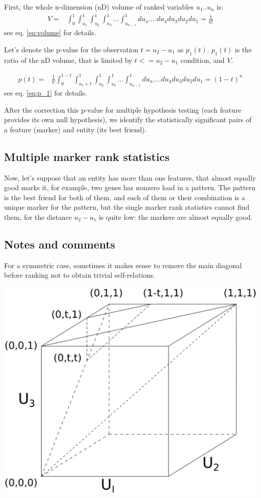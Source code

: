 \documentclass{llncs}
\begin{document}
First, the whole n-dimension (nD) volume of ranked variables $u_1 .. u_n$ is:
\begin{eqnarray*}
V = &\displaystyle \int_0^1\int_{u_1}^1\int_{u_2}^1\int_{u_3}^1...\int_{u_{n-1}}^1 du_n....du_4 du_3 du_2 du_1 =  \frac{1}{n!}
\end{eqnarray*}
see eq. \ref{eq:volume} for details.

Let's denote the p-value for the observation $t=u_2-u_1$ as $p_1(t)$. $p_1(t)$ is the ratio of the nD volume, that is limited by $t<=u_2-u_1$ condition, and $V$.

\begin{eqnarray*}
p(t) = & \displaystyle\frac{1}{V} \displaystyle \int_0^{1-t}\int_{{u_1}+t}^1\int_{u_2}^1\int_{u_3}^1...\int_{u_{n-1}}^1 du_n....du_4 du_3 du_2 du_1 = (1-t)^n
\end{eqnarray*}
see eq. \ref{eq:p_1} for details.

After the correction this p-value for multiple hypothesis testing (each feature provides its own null hypothesis), we identify the statistically significant pairs of a feature (marker) and entity (its best friend).

\subsection{Multiple marker rank statistics}
Now, let's suppose that an entity has more than one features, that almost equally good marks it, for example, two genes has nonzero load in a pattern. The pattern is the best friend for both of them, and each of them or their combination is a unique marker for the pattern, but the single marker rank statistics cannot find them, for the distance $u_2-u_1$ is quite low: the markers are almost equally good.

\subsection*{Notes and comments}

For a symmetric case, sometimes it makes sense to remove the main diagonal before ranking not to obtain trivial self-relations.

\includegraphics[scale=.5,trim=0 10cm 0 0, clip=true]{rank3d-nocolour}
\end{document}
